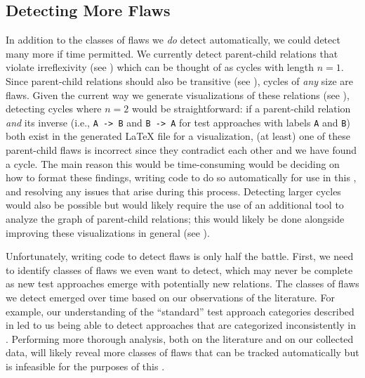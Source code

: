 \subsection{Detecting More Flaws}\label{future-detect-flaws}
In addition to the classes of flaws we \emph{do} detect automatically, we could
detect many more if time permitted. We currently detect parent-child relations
that violate irreflexivity (see ) which can be thought of as
cycles with length $n=1$. Since parent-child relations should also be
transitive (see ), cycles of \emph{any} size are flaws.
Given the current way we generate visualizations of these relations (see
), detecting cycles where $n=2$ would be straightforward: if
a parent-child relation \emph{and} its inverse (i.e., \texttt{A~->~B} and
\texttt{B~->~A} for test approaches with labels \texttt{A} and \texttt{B}) both
exist in the generated \LaTeX{} file for a visualization, (at least) one of
these parent-child flaws is incorrect since they contradict each other and we
have found a cycle. The main reason this would be time-consuming would be
deciding on how to format these findings, writing code to do so automatically
for use in this \docType{}, and resolving any issues that arise during this
process. Detecting larger cycles would also be possible but would likely
require the use of an additional tool to analyze the graph of parent-child
relations; this would likely be done alongside improving these visualizations
in general (see ).

Unfortunately, writing code to detect flaws is only half the battle. First, we
need to identify classes of flaws we even want to detect, which may never be
complete as new test approaches emerge with potentially new relations. The
classes of flaws we detect emerged over time based on our observations of the
literature. For example, our understanding of the ``standard'' test approach
categories described in  led to us being able to detect
approaches that are categorized inconsistently in .
Performing more thorough analysis, both on the literature and on our collected
data, will likely reveal more classes of flaws that can be tracked
automatically but is infeasible for the purposes of this \docType{}.

